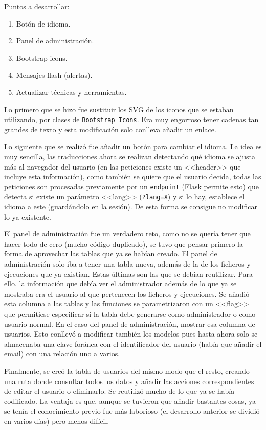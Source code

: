 Puntos a desarrollar:
\begin{enumerate}
    \item Botón de idioma.
    \item Panel de administración.
    \item Bootstrap icons.
    \item Mensajes flash (alertas).
    \item Actualizar técnicas y herramientas.
\end{enumerate}

Lo primero que se hizo fue sustituir los SVG de los iconos que se estaban
utilizando, por clases de \texttt{Bootstrap Icons}. Era muy engorroso tener cadenas tan
grandes de texto y esta modificación solo conlleva añadir un enlace.

Lo siguiente que se realizó fue añadir un botón para cambiar el idioma. La idea
es muy sencilla, las traducciones ahora se realizan detectando qué idioma se
ajusta más al navegador del usuario (en las peticiones existe un <<header>> que
incluye esta información), como también se quiere que el usuario decida, todas
las peticiones son procesadas previamente por un \texttt{endpoint} (Flask
permite esto) que detecta si existe un parámetro <<lang>> (\texttt{?lang=X}) y
si lo hay, establece el idioma a este (guardándolo en la sesión). De esta forma
se consigue no modificar lo ya existente.

El panel de administración fue un verdadero reto, como no se quería tener que
hacer todo de cero (mucho código duplicado), se tuvo que pensar primero la forma
de aprovechar las tablas que ya se habían creado. El panel de administración
solo iba a tener una tabla nueva, además de la de los ficheros y ejecuciones que
ya existían. Estas últimas son las que se debían reutilizar. Para ello, la
información que debía ver el administrador además de lo que ya se mostraba era
el usuario al que pertenecen los ficheros y ejecuciones. Se añadió esta columna
a las tablas y las funciones se parametrizaron con un <<flag>> que permitiese
especificar si la tabla debe generarse como administrador o como usuario normal.
En el caso del panel de administración, mostrar esa columna de usuarios. Esto
conllevó a modificar también los modelos pues hasta ahora solo se almacenaba una
clave foránea con el identificador del usuario (había que añadir el email) con
una relación uno a varios.

Finalmente, se creó la tabla de usuarios del mismo modo que el resto, creando
una ruta donde consultar todos los datos y añadir las acciones correspondientes
de editar el usuario o eliminarlo. Se reutilizó mucho de lo que ya se había
codificado. La ventaja es que, aunque se tuvieron que añadir bastantes cosas, ya
se tenía el conocimiento previo fue más laborioso (el desarrollo anterior se
dividió en varios días) pero menos difícil.

